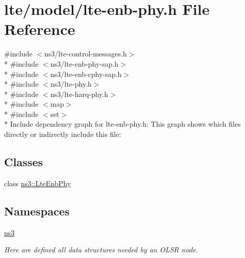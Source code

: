 \hypertarget{lte-enb-phy_8h}{}\section{lte/model/lte-\/enb-\/phy.h File Reference}
\label{lte-enb-phy_8h}
{\ttfamily \#include $<$ns3/lte-\/control-\/messages.\+h$>$}\\*
{\ttfamily \#include $<$ns3/lte-\/enb-\/phy-\/sap.\+h$>$}\\*
{\ttfamily \#include $<$ns3/lte-\/enb-\/cphy-\/sap.\+h$>$}\\*
{\ttfamily \#include $<$ns3/lte-\/phy.\+h$>$}\\*
{\ttfamily \#include $<$ns3/lte-\/harq-\/phy.\+h$>$}\\*
{\ttfamily \#include $<$map$>$}\\*
{\ttfamily \#include $<$set$>$}\\*
Include dependency graph for lte-\/enb-\/phy.h\+:
This graph shows which files directly or indirectly include this file\+:
\subsection*{Classes}
\begin{DoxyCompactItemize}
\item 
class \hyperlink{classns3_1_1LteEnbPhy}{ns3\+::\+Lte\+Enb\+Phy}
\end{DoxyCompactItemize}
\subsection*{Namespaces}
\begin{DoxyCompactItemize}
\item 
 \hyperlink{namespacens3}{ns3}
\begin{DoxyCompactList}\small\item\em Here are defined all data structures needed by an O\+L\+SR node. \end{DoxyCompactList}\end{DoxyCompactItemize}
